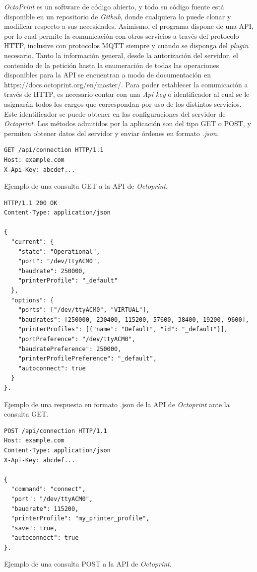 \textit{OctoPrint} es un software de código abierto, y todo su código fuente está disponible en un repositorio de \textit{Github}, donde cualquiera lo puede clonar y modificar respecto a sus necesidades. Asimismo, el programa dispone de una API, por lo cual permite la comunicación con otros servicios a través del protocolo HTTP, inclusive con protocolos MQTT siempre y cuando se disponga del \textit{plugin} necesario. Tanto la información general, desde la autorización del servidor, el contenido de la petición hasta la enumeración de todas las operaciones disponibles para la API se encuentran a modo de documentación en https://docs.octoprint.org/en/master/.
Para poder establecer la comunicación a través de HTTP, es necesario contar con una \textit{Api key} o identificador al cual se le asignarán todos los cargos que correspondan por uso de los distintos servicios. Este identificador se puede obtener en las configuraciones del servidor de \textit{Octoprint}. Los métodos admitidos por la aplicación son del tipo GET o POST, y permiten obtener datos del servidor y enviar órdenes en formato \textit{.json.}  

\begin{table}[H]
\begin{lstlisting}
GET /api/connection HTTP/1.1
Host: example.com
X-Api-Key: abcdef...
\end{lstlisting}
\caption{Ejemplo de una consulta GET a la API de \textit{Octoprint}.}
\end{table}

\begin{table}[H]
\begin{lstlisting}
HTTP/1.1 200 OK
Content-Type: application/json

{
  "current": {
    "state": "Operational",
    "port": "/dev/ttyACM0",
    "baudrate": 250000,
    "printerProfile": "_default"
  },
  "options": {
    "ports": ["/dev/ttyACM0", "VIRTUAL"],
    "baudrates": [250000, 230400, 115200, 57600, 38400, 19200, 9600],
    "printerProfiles": [{"name": "Default", "id": "_default"}],
    "portPreference": "/dev/ttyACM0",
    "baudratePreference": 250000,
    "printerProfilePreference": "_default",
    "autoconnect": true
  }
}.
\end{lstlisting}
\caption{Ejemplo de una respuesta en formato .json de la API de \textit{Octoprint} ante la consulta GET.}
\end{table}

\begin{table}[H]
\begin{lstlisting}
POST /api/connection HTTP/1.1
Host: example.com
Content-Type: application/json
X-Api-Key: abcdef...

{
  "command": "connect",
  "port": "/dev/ttyACM0",
  "baudrate": 115200,
  "printerProfile": "my_printer_profile",
  "save": true,
  "autoconnect": true
}.
\end{lstlisting}
\caption{Ejemplo de una consulta POST a la API de \textit{Octoprint}.}
\end{table}

